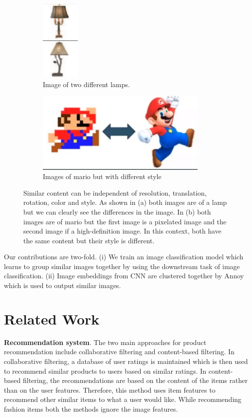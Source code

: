 \documentclass[12pt,twocolumn,letterpaper,Times New Roman]{article}
\begin{document}
\begin{figure}
  \centering
  \begin{subfigure}{0.4\linewidth}
    \includegraphics[height=4cm]{images/fig1.png}
    \caption{Image of two different lamps.}
  \end{subfigure}
  \begin{subfigure}{0.4\linewidth}
    \includegraphics[height=4cm]{images/fig2.png}
    \caption{Images of mario but with different style}
  \end{subfigure}
  \caption{Similar content can be independent of resolution, translation, rotation, color and style. As shown in (a) both images are of a lamp but we can clearly see the differences in the image. In (b) both images are of mario but the first image is a pixelated image and the second image if a high-definition image. In this context, both have the same content but their style is different.}
  \label{fig:fig1}
\end{figure}

Our contributions are two-fold. (i) We train an image classification model which learns to group similar images together by using the downstream task of image classification. (ii) Image embeddings from CNN are clustered together by Annoy which is used to output similar images.

\section{Related Work}
\textbf{Recommendation system}. The two main approaches for product recommendation include collaborative filtering and content-based filtering. In collaborative filtering, a database of user ratings is maintained which is then used to recommend similar products to users based on similar ratings. In content-based filtering, the recommendations are based on the content of the items rather than on the user features. Therefore, this method uses item features to recommend other similar items to what a user would like. While recommending fashion items both the methods ignore the image features.
\end{document}
